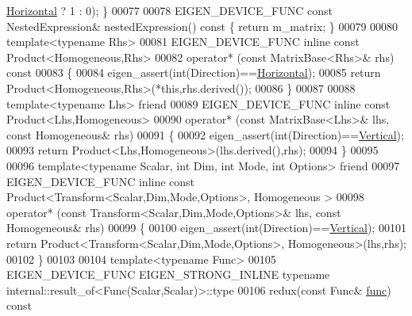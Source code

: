 \begin{DoxyCode}
      \hyperlink{group__enums_ggad49a7b3738e273eb00932271b36127f7aae8a16b3b9272683c1162915f6d892be}{Horizontal} ? 1 : 0); \}
00077     
00078     EIGEN\_DEVICE\_FUNC \textcolor{keyword}{const} NestedExpression& nestedExpression()\textcolor{keyword}{ const }\{ \textcolor{keywordflow}{return} m\_matrix; \}
00079 
00080     \textcolor{keyword}{template}<\textcolor{keyword}{typename} Rhs>
00081     EIGEN\_DEVICE\_FUNC \textcolor{keyword}{inline} \textcolor{keyword}{const} Product<Homogeneous,Rhs>
00082     operator* (\textcolor{keyword}{const} MatrixBase<Rhs>& rhs)\textcolor{keyword}{ const}
00083 \textcolor{keyword}{    }\{
00084       eigen\_assert(\textcolor{keywordtype}{int}(Direction)==\hyperlink{group__enums_ggad49a7b3738e273eb00932271b36127f7aae8a16b3b9272683c1162915f6d892be}{Horizontal});
00085       \textcolor{keywordflow}{return} Product<Homogeneous,Rhs>(*\textcolor{keyword}{this},rhs.derived());
00086     \}
00087 
00088     \textcolor{keyword}{template}<\textcolor{keyword}{typename} Lhs> \textcolor{keyword}{friend}
00089     EIGEN\_DEVICE\_FUNC \textcolor{keyword}{inline} \textcolor{keyword}{const} Product<Lhs,Homogeneous>
00090     operator* (\textcolor{keyword}{const} MatrixBase<Lhs>& lhs, \textcolor{keyword}{const} Homogeneous& rhs)
00091     \{
00092       eigen\_assert(\textcolor{keywordtype}{int}(Direction)==\hyperlink{group__enums_ggad49a7b3738e273eb00932271b36127f7addca718e0564723df21d61b94b1198be}{Vertical});
00093       \textcolor{keywordflow}{return} Product<Lhs,Homogeneous>(lhs.derived(),rhs);
00094     \}
00095 
00096     \textcolor{keyword}{template}<\textcolor{keyword}{typename} Scalar, \textcolor{keywordtype}{int} Dim, \textcolor{keywordtype}{int} Mode, \textcolor{keywordtype}{int} Options> \textcolor{keyword}{friend}
00097     EIGEN\_DEVICE\_FUNC \textcolor{keyword}{inline} \textcolor{keyword}{const} Product<Transform<Scalar,Dim,Mode,Options>, Homogeneous >
00098     operator* (\textcolor{keyword}{const} Transform<Scalar,Dim,Mode,Options>& lhs, \textcolor{keyword}{const} Homogeneous& rhs)
00099     \{
00100       eigen\_assert(\textcolor{keywordtype}{int}(Direction)==\hyperlink{group__enums_ggad49a7b3738e273eb00932271b36127f7addca718e0564723df21d61b94b1198be}{Vertical});
00101       \textcolor{keywordflow}{return} Product<Transform<Scalar,Dim,Mode,Options>, Homogeneous>(lhs,rhs);
00102     \}
00103 
00104     \textcolor{keyword}{template}<\textcolor{keyword}{typename} Func>
00105     EIGEN\_DEVICE\_FUNC EIGEN\_STRONG\_INLINE \textcolor{keyword}{typename} internal::result\_of<Func(Scalar,Scalar)>::type
00106     redux(\textcolor{keyword}{const} Func& \hyperlink{structfunc}{func})\textcolor{keyword}{ const}

\end{DoxyCode}
